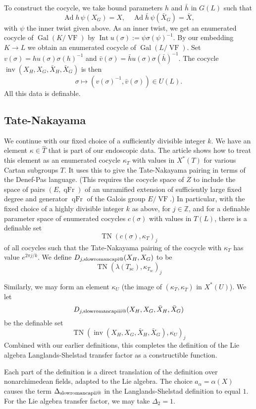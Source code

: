 \documentclass[12pt]{amsart}
\makeatletter
\newcommand*{\rom}[1]{\text{\expandafter\@slowromancap\romannumeral #1@}}
\newcommand{\op}[1]{\operatorname{#1}}
\newcommand{\ring}[1]{{\mathbb #1}}
\def\VF{{\op{VF}}}
\theoremstyle{plain}
\theoremstyle{definition}
\makeatother
\begin{document}
To construct the cocycle, we take bound parameters $h$ and $\bar h$
 in $G(L)$ such that
\[
\op{Ad} h\,\psi(X_G)  = X,\quad \op{Ad} \bar h\, \psi(\bar X_G) = \bar X,
\]
with $\psi$ the inner twist given above.  As an inner twist, we get an
enumerated cocycle of $\op{Gal}(K/\VF)$ by $\op{Int} u(\sigma) := \psi
\sigma(\psi)^{-1}$.  By our embedding $K\to L$ we obtain an enumerated
cocycle of $\op{Gal}(L/\VF)$.  Set $v(\sigma) = h u(\sigma)
\sigma(h)^{-1}$ and $\bar v(\sigma) = \bar h u(\sigma) \sigma(\bar
h)^{-1}$. The cocycle $\op{inv}(X_H,X_G,\bar X_H,\bar X_G)$ is then
\[
\sigma \mapsto (v(\sigma)^{-1},\bar v(\sigma))\in U(L).
\]
All this data is definable.

\subsection{Tate-Nakayama}

We continue with our fixed choice of a sufficiently divisible integer
$k$.  We have an element $\kappa\in \hat T$ that is part of our
endoscopic data.  The article \cite{CHL} shows how to treat this
element as an enumerated cocycle $\kappa_T$ with values in $X^*(T)$
for various Cartan subgroups $T$.  It uses this to give the
Tate-Nakayama pairing in terms of the Denef-Pas language.  (This
requires the cocycle space of $Z$ to include the space of pairs
$(E,\op{qFr})$ of an unramified extension of sufficiently large fixed
degree and generator $\op{qFr}$ of the Galois group $E/\VF$.)  In
particular, with the fixed choice of a highly divisible integer $k$ as
above, for $j\in \ring{Z}$, and for a definable parameter space of
enumerated cocycles $c(\sigma)$ with values in $T(L)$, there is a
definable set
\[
\op{TN}( c(\sigma),\kappa_T)_j
\]
of all cocycles such that the Tate-Nakayama pairing of the cocycle with
$\kappa_T$ has value $e^{2\pi j/k}$.  We define $D_{j,\rom1}(X_H,X_G)$ to
be
\[
\op{TN}( \lambda(T_{\text{sc}}),\kappa_{T_{\text{sc}}})_j
\]

Similarly, we may form an element $\kappa_U$ (the image of
$(\kappa_T,\kappa_{\bar T})$ in $X^*(U)$).  We let
\[
D_{j,\rom{3}}(X_H,X_G,\bar X_H,\bar X_G)
\]
 be the definable set
\[
\op{TN}( \op{inv}(X_H,X_G,\bar
X_H,\bar X_G),\kappa_{U})_j
\]
Combined with our earlier definitions, this completes the definition
of the Lie algebra Langlands-Shelstad transfer factor as a
constructible function.


Each part of the definition is a direct translation of the definition
over nonarchimedean fields, adapted to the Lie algebra.  The choice
$a_\alpha = \alpha(X)$ causes the term $\Delta_{\rom2}$ in the
Langlands-Shelstad definition to equal $1$.  For the Lie algebra
transfer factor, we may take $\Delta_{2}=1$.
\end{document}
